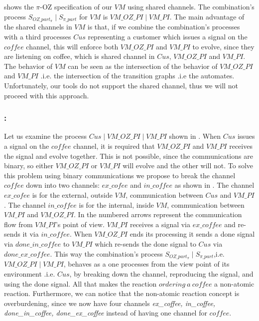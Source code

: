  shows the $\pi$-OZ specification of our $VM$ using shared channels.
The combination's process $S_{OZ\_part_\pi} \mid S_{\pi\_part}$ for $VM$ is $VM\_OZ\_PI \mid VM\_PI$. The main advantage of the shared channels in $VM$ is that, if we combine the combination's processes with a third processes $Cus$ representing a customer which issues a signal on the $coffee$ channel, this will enforce both $VM\_OZ\_PI$ and $VM\_PI$ to evolve, since they are listening on coffee, which is shared channel in  $Cus$, $VM\_OZ\_PI$ and $VM\_PI$. The behavior of $VM$ can be seen as the intersection of the behavior of  $VM\_OZ\_PI$ and $VM\_PI$ .i.e. the intersection of the transition graphs .i.e the automates. Unfortunately, our tools do not support the shared channel, thus we will not proceed with this approach.




\subsubsection{:} Let us examine the process $Cus \mid VM\_OZ\_PI \mid VM\_PI$ shown in . When $Cus$ issues a signal on the $coffee$ channel, it is required that $VM\_OZ\_PI$ and $VM\_PI$ receives the signal and evolve together. This is not possible, since the \picalc{} communications are binary, so either $VM\_OZ\_PI$ or $VM\_PI$ will evolve and the other will not. To solve this problem using binary communications we propose to break the channel $coffee$ down into two channels: $ex\_cofee$ and $in\_coffee$ as shown in . The channel $ex\_cofee$ is for the external, outside $VM$, communication between $Cus$ and $VM\_PI$. The channel $in\_coffee$ is for the internal, inside $VM$, communication between $VM\_PI$ and $VM\_OZ\_PI$. In  the numbered arrows represent the communication flow from $VM\_PI$'s point of view. $VM\_PI$  receives a signal via $ex\_coffee$ and re-sends it via $in\_coffee$. When $VM\_OZ\_PI$ ends its processing it sends a done signal via  $done\_in\_coffee$ to $VM\_PI$ which re-sends the done signal to $Cus$ via $done\_ex\_coffee$. This way the combination's process $S_{OZ\_part_\pi} \mid S_{\pi\_part}$,i.e. $VM\_OZ\_PI \mid VM\_PI$, behaves as a one processes from the view point of its environment .i.e. $Cus$, by breaking down the channel, reproducing the signal, and using the done signal. All that makes the reaction $ordering\ a\ coffee$ a non-atomic reaction. Furthermore, we can notice  that the non-atomic reaction concept is overburdening, since we now have four channels \textit{ex\_coffee, in\_coffee, done\_in\_coffee, done\_ex\_coffee} instead of having one channel for $coffee$.

